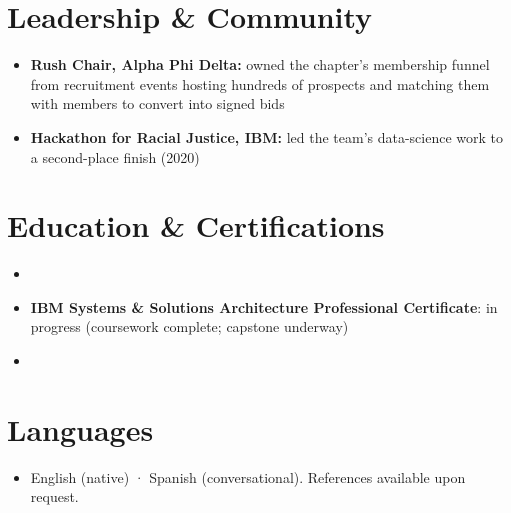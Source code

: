 \documentclass[11pt,a4paper,sans]{moderncv}
\begin{document}

\section{Leadership \& Community}
\vspace{1pt}
\begin{itemize}
\item \textbf{Rush Chair, Alpha Phi Delta:} owned the chapter's membership funnel from recruitment events hosting hundreds of prospects and matching them with members to convert into signed bids
\item \textbf{Hackathon for Racial Justice, IBM:} led the team's data-science work to a second-place finish (2020)
\end{itemize}


\section{Education \& Certifications}
\vspace{1pt}
\begin{itemize}

\item{}

\vspace{3pt}

\item \textbf{IBM Systems \& Solutions Architecture Professional Certificate}: in progress (coursework complete; capstone underway)

\vspace{3pt}

\item{}

\end{itemize}


\section{Languages}
\vspace{1pt}
\begin{itemize}
\item{English (native) · Spanish (conversational). References available upon request.}
\end{itemize}
\end{document}
